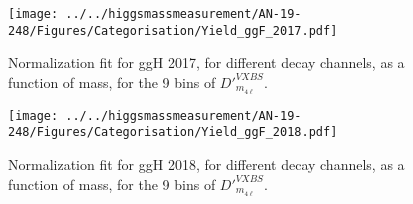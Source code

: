 \begin{figure}[!htbp]
\begin{center}
		\texttt{[image: ../../higgsmassmeasurement/AN-19-248/Figures/Categorisation/Yield\_ggF\_2017.pdf]}
\caption{
Normalization fit for ggH 2017, for different decay channels, as a function
of mass, for the 9 bins of $D'^{VXBS}_{m_{4\ell}}$.}
\label{signal_normalization_2017}
\end{center}
\end{figure}
\begin{figure}[!htbp]
\begin{center}
		\texttt{[image: ../../higgsmassmeasurement/AN-19-248/Figures/Categorisation/Yield\_ggF\_2018.pdf]}
\caption{
Normalization fit for ggH 2018, for different decay channels, as a function
of mass, for the 9 bins of $D'^{VXBS}_{m_{4\ell}}$.}
\label{signal_normalization_2018}
\end{center}
\end{figure}


